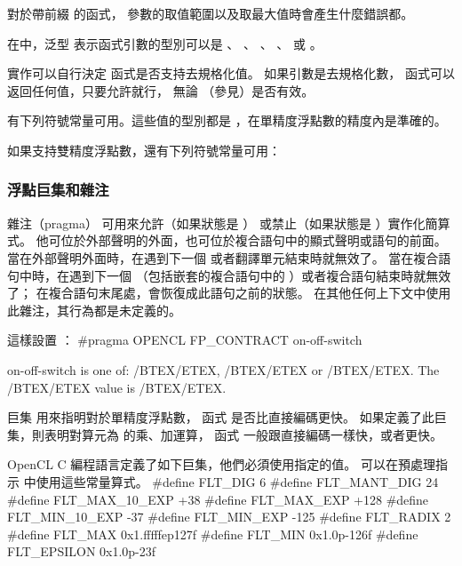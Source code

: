 \startnotepar
對於帶前綴  的函式，
參數的取值範圍以及取最大值時會產生什麼錯誤都。
\stopnotepar

在中，泛型  表示函式引數的型別可以是
 、 、 、 、
  或 。

{}

實作可以自行決定  函式是否支持去規格化值。
如果引數是去規格化數，  函式可以返回任何值，只要允許就行，
無論  （參見）是否有效。

有下列符號常量可用。這些值的型別都是 ，在單精度浮點數的精度內是準確的。


如果支持雙精度浮點數，還有下列符號常量可用：


\subsubsection{浮點巨集和雜注}

雜注（pragma）  可用來允許（如果狀態是 ）
或禁止（如果狀態是 ）實作化簡算式。
他可位於外部聲明的外面，也可位於複合語句中的顯式聲明或語句的前面。
當在外部聲明外面時，在遇到下一個  或者翻譯單元結束時就無效了。
當在複合語句中時，在遇到下一個 
（包括嵌套的複合語句中的 ）或者複合語句結束時就無效了；
在複合語句末尾處，會恢復成此語句之前的狀態。
在其他任何上下文中使用此雜注，其行為都是未定義的。

這樣設置 ：
\startclc
#pragma OPENCL FP_CONTRACT on-off-switch

on-off-switch is one of:
	/BTEX/ETEX, /BTEX/ETEX or /BTEX/ETEX.
	The /BTEX/ETEX value is /BTEX/ETEX.
\stopclc

巨集  用來指明對於單精度浮點數，
函式  是否比直接編碼更快。
如果定義了此巨集，則表明對算元為  的乘、加運算，
函式  一般跟直接編碼一樣快，或者更快。

OpenCL C 編程語言定義了如下巨集，他們必須使用指定的值。
可以在預處理指示  中使用這些常量算式。
\startclc
#define FLT_DIG		6
#define FLT_MANT_DIG	24
#define FLT_MAX_10_EXP	+38
#define FLT_MAX_EXP	+128
#define FLT_MIN_10_EXP	-37
#define FLT_MIN_EXP	-125
#define FLT_RADIX	2
#define FLT_MAX		0x1.fffffep127f
#define FLT_MIN		0x1.0p-126f
#define FLT_EPSILON	0x1.0p-23f
\stopclc

